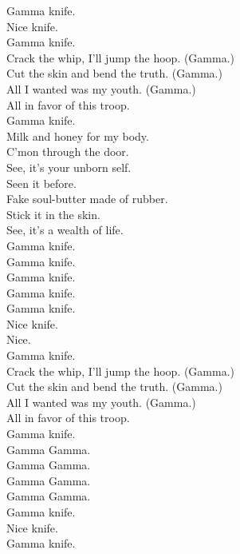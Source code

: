 Gamma knife. \\
Nice knife. \\
Gamma knife. \\

Crack the whip, I'll jump the hoop. (Gamma.) \\
Cut the skin and bend the truth. (Gamma.) \\
All I wanted was my youth. (Gamma.) \\
All in favor of this troop. \\
Gamma knife. \\

Milk and honey for my body. \\
C'mon through the door. \\
See, it's your unborn self. \\

Seen it before. \\
Fake soul-butter made of rubber. \\
Stick it in the skin. \\
See, it's a wealth of life. \\

Gamma knife. \\
Gamma knife. \\
Gamma knife. \\
Gamma knife. \\

Gamma knife. \\
Nice knife. \\
Nice. \\
Gamma knife. \\

Crack the whip, I'll jump the hoop. (Gamma.) \\
Cut the skin and bend the truth. (Gamma.) \\
All I wanted was my youth. (Gamma.) \\
All in favor of this troop. \\
Gamma knife. \\

Gamma Gamma. \\
Gamma Gamma. \\
Gamma Gamma. \\
Gamma Gamma. \\

Gamma knife. \\
Nice knife. \\
Gamma knife. \\

